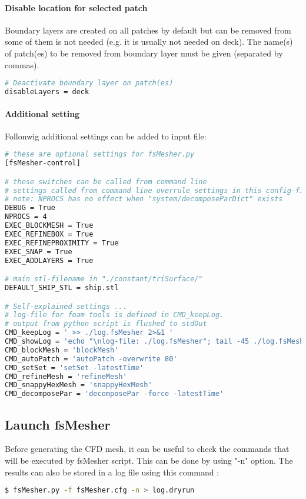 \paragraph{Disable location for selected patch}
Boundary layers are created on all patches by default but can be removed from some of them is not needed (e.g. it is usually not needed on deck). The name(s) of patch(es) to be removed from boundary layer must be given (separated by commas).
\begin{lstlisting}[language=bash]
# Deactivate boundary layer on patch(es)
disableLayers = deck
\end{lstlisting}

\paragraph{Additional setting}
Follonwig additional settings can be added to input file:

\begin{lstlisting}[language=bash]
# these are optional settings for fsMesher.py
[fsMesher-control]

# these switches can be called from command line
# settings called from command line overrule settings in this config-file
# note: NPROCS has no effect when "system/decomposeParDict" exists
DEBUG = True
NPROCS = 4
EXEC_BLOCKMESH = True
EXEC_REFINEBOX = True
EXEC_REFINEPROXIMITY = True
EXEC_SNAP = True
EXEC_ADDLAYERS = True

# main stl-filename in "./constant/triSurface/"
DEFAULT_SHIP_STL = ship.stl

# Self-explained settings ... 
# log-file for foam tools is defined in CMD_keepLog.
# output from python script is flushed to stdOut
CMD_keepLog = ' >> ./log.fsMesher 2>&1 '
CMD_showLog = 'echo "\nlog-file: ./log.fsMesher"; tail -45 ./log.fsMesher; echo "Please see log-file: ./log.fsMesher"'
CMD_blockMesh = 'blockMesh'
CMD_autoPatch = 'autoPatch -overwrite 80'
CMD_setSet = 'setSet -latestTime'
CMD_refineMesh = 'refineMesh'
CMD_snappyHexMesh = 'snappyHexMesh'
CMD_decomposePar = 'decomposePar -force -latestTime'
\end{lstlisting}

\subsection{Launch fsMesher}

Before generating the CFD mesh, it can be useful to check the commands that will be executed by fsMesher script. This can be done by using "-n" option. The results can also be stored in a log file using this command :
\begin{lstlisting}[language=bash]
$ fsMesher.py -f fsMesher.cfg -n > log.dryrun
\end{lstlisting}

